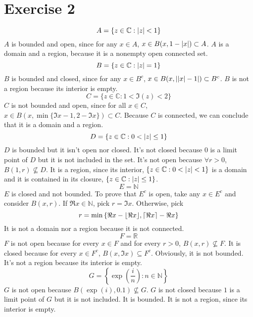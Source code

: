 \documentclass{report}
\def\C{\mathbb{C}}
\def\R{\mathbb{R}}
\def\N{\mathbb{N}}
\DeclarePairedDelimiter\abs{\lvert}{\rvert}%
\DeclarePairedDelimiter\ceil{\lceil}{\rceil}
\DeclarePairedDelimiter\floor{\lfloor}{\rfloor}
\renewcommand{\exp}[1]{\operatorname{exp}\left(#1\right)}
\begin{document}
    \section*{Exercise 2}
    \begin{equation*}
        A = \{z \in \C : \abs{z} < 1\}
    \end{equation*}
    $A$ is bounded and open, since for any $x \in A$, $x \in B(x, 1 - \abs{x}) \subset A$. $A$ is a domain and a region, because it is a nonempty open connected set.
    \begin{equation*}
        B = \{z \in \C : \abs{z} = 1\}
    \end{equation*}
    $B$ is bounded and closed, since for any $x \in B^c$, $x \in B(x, \abs{\abs{x} - 1}) \subset B^c$. $B$ is not a region because its interior is empty.
    \begin{equation*}
        C = \{z \in \C : 1 < \Im(z) < 2\}
    \end{equation*}
    $C$ is not bounded and open, since for all $x \in C$, $x \in B(x, \min{\{\Im{x} - 1, 2 - \Im{x}}\}) \subset C$. Because $C$ is connected, we can conclude that it is a domain and a region.
    \begin{equation*}
        D = \{z \in \C : 0 < \abs{z} \leq 1\}
    \end{equation*}
    $D$ is bounded but it isn't open nor closed. It's not closed because $0$ is a limit point of $D$ but it is not included in the set. It's not open because $\forall r > 0$, $B(1, r) \nsubseteq D$. It is a region, since its interior, $\{z \in \C : 0 < \abs{z} < 1\}$ is a domain and it is contained in its closure, $\{z \in \C : \abs{z} \leq 1\}$.
    \begin{equation*}
        E = \N
    \end{equation*}
    $E$ is closed and not bounded. To prove that $E^c$ is open, take any $x \in E^c$ and consider $B(x, r)$. If $\Re{x} \in \N$, pick $r = \Im{x}$. Otherwise, pick 
    \begin{equation*}
        r = \min{\{\Re{x} - \floor{\Re{x}}, \ceil{\Re{x}} - \Re{x}\}}
    \end{equation*}
    It is not a domain nor a region because it is not connected.
    \begin{equation*}
        F = \R
    \end{equation*}
    $F$ is not open because for every $x \in F$ and for every $r > 0$, $B(x, r) \nsubseteq F$. It is closed because for every $x \in F^c$, $B(x, \Im{x}) \subseteq F^c$. Obviously, it is not bounded. It's not a region because its interior is empty.
    \begin{equation*}
        G = \left\{\exp{\frac{i}{n}} : n \in \N\right\}
    \end{equation*}
    $G$ is not open because $B(\exp{i}, 0.1) \nsubseteq G$. $G$ is not closed because $1$ is a limit point of $G$ but it is not included. It is bounded. It is not a region, since its interior is empty.
\end{document}
